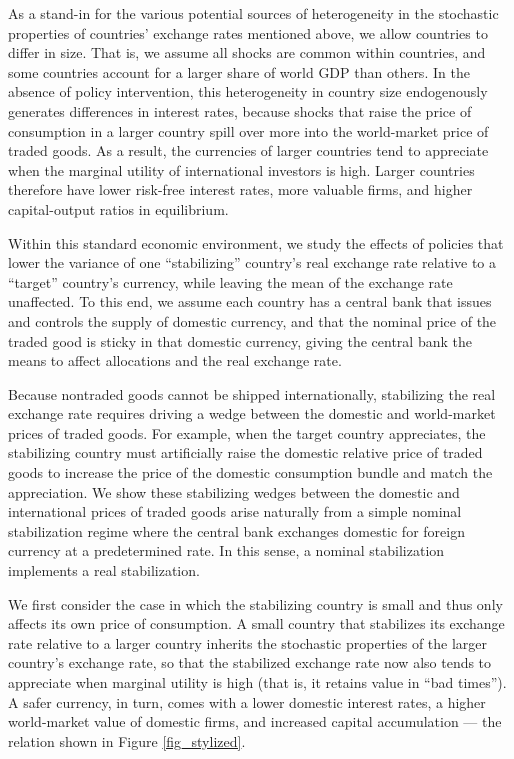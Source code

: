 \documentclass[12pt,letter]{article}
\theoremstyle{break} \theorembodyfont{\normalfont\itshape}
\theoremstyle{break}
\theoremstyle{break} \theorembodyfont{\normalfont\itshape}
\theoremstyle{break} \theorembodyfont{\normalfont\itshape}
\begin{document}
As a stand-in for the various potential sources of heterogeneity in
the stochastic properties of countries' exchange rates mentioned
above, we allow countries to differ in size. That is, we assume all
shocks are common within countries, and some countries account for a
larger share of world GDP than others. In the absence of policy
intervention, this heterogeneity in country size endogenously
generates differences in interest rates, because shocks that raise the
price of consumption in a larger country spill over more into the
world-market price of traded goods. As a result, the currencies of
larger countries tend to appreciate when the marginal utility of
international investors is high. Larger countries therefore have lower
risk-free interest rates, more valuable firms, and higher
capital-output ratios in equilibrium.

Within this standard economic environment, we study the effects of
policies that lower the variance of one ``stabilizing'' country's real
exchange rate relative to a ``target'' country's currency, while
leaving the mean of the exchange rate unaffected. To this end, we
assume each country has a central bank that issues and controls the
supply of domestic currency, and that the nominal price of the traded
good is sticky in that domestic currency, giving the central bank the
means to affect allocations and the real exchange rate.

Because nontraded goods cannot be shipped internationally, stabilizing
the real exchange rate requires driving a wedge between the domestic
and world-market prices of traded goods. For example, when the target
country appreciates, the stabilizing country must artificially raise
the domestic relative price of traded goods to increase the price of
the domestic consumption bundle and match the appreciation. We show
these stabilizing wedges between the domestic and international prices
of traded goods arise naturally from a simple nominal stabilization
regime where the central bank exchanges domestic for foreign currency
at a predetermined rate. In this sense, a nominal stabilization
implements a real stabilization.

We first consider the case in which the stabilizing country is small
and thus only affects its own price of consumption. A small country
that stabilizes its exchange rate relative to a larger country
inherits the stochastic properties of the larger country's exchange
rate, so that the stabilized exchange rate now also tends to
appreciate when marginal utility is high (that is, it retains value in
``bad times''). A safer currency, in turn, comes with a lower domestic
interest rates, a higher world-market value of domestic firms, and
increased capital accumulation --- the relation shown in Figure
\ref{fig_stylized}.
\end{document}
